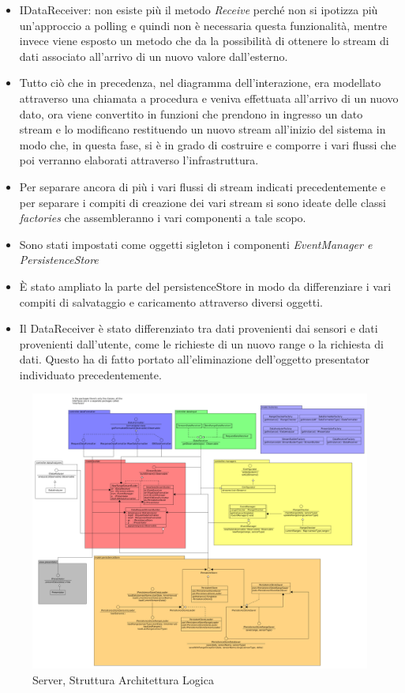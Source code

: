 \begin{itemize}
\item IDataReceiver: non esiste pi\`u il metodo \textit{Receive} perch\'e non si ipotizza pi\`u un'approccio a polling e quindi non \`e necessaria questa funzionalit\`a, mentre invece viene esposto un metodo che da la possibilit\`a di ottenere lo stream di dati associato all'arrivo di un nuovo valore dall'esterno.
\item Tutto ci\`o che in precedenza, nel diagramma dell'interazione, era modellato attraverso una chiamata a procedura e veniva effettuata all'arrivo di un nuovo dato, ora viene convertito in funzioni che prendono in ingresso un dato stream e lo modificano restituendo un nuovo stream all'inizio del sistema in modo che, in questa fase, si \`e in grado di costruire e comporre i vari flussi che poi verranno elaborati attraverso l'infrastruttura.
\item Per separare ancora di pi\`u i vari flussi di stream indicati precedentemente e per separare i compiti di creazione dei vari stream si sono ideate delle classi \textit{factories} che assembleranno i vari componenti a tale scopo.
\item Sono stati impostati come oggetti sigleton i componenti \textit{EventManager e PersistenceStore}
\item \`E stato ampliato la parte del persistenceStore in modo da differenziare i vari compiti di salvataggio e caricamento attraverso diversi oggetti.
\item Il DataReceiver \`e stato differenziato tra dati provenienti dai sensori e dati provenienti dall'utente, come le richieste di un nuovo range o la richiesta di dati. Questo ha di fatto portato all'eliminazione dell'oggetto presentator individuato precedentemente.
\end{itemize}

\begin{figure}
\centering
\includegraphics[width=\textwidth]{Figures/LogicArchitecture/Server/Structure}
\caption{Server, Struttura Architettura Logica}
\end{figure}

